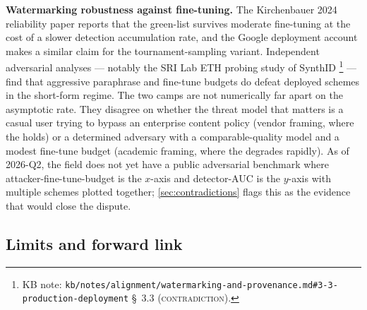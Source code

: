 \begin{contradiction}
\textbf{Watermarking robustness against fine-tuning.} The Kirchenbauer
2024 reliability paper  reports that the
green-list  survives moderate fine-tuning at the cost of a
slower detection accumulation rate, and the Google 
deployment account
makes a similar claim for the tournament-sampling variant. Independent
adversarial analyses --- notably the SRI Lab ETH probing study of
SynthID%
\footnote{KB note: \nolinkurl{kb/notes/alignment/watermarking-and-provenance.md#3-3-production-deployment}
\S~3.3 (\textsc{contradiction}).}
--- find that aggressive paraphrase and fine-tune budgets do defeat
deployed schemes in the short-form regime. The two camps are not
numerically far apart on the asymptotic rate. They disagree on whether
the threat model that matters is a casual user trying to bypass an
enterprise content policy (vendor framing, where the  holds)
or a determined adversary with a comparable-quality model and a
modest fine-tune budget (academic framing, where the 
degrades rapidly). As of 2026-Q2, the field does not yet have a
public adversarial benchmark where attacker-fine-tune-budget is the
$x$-axis and detector-AUC is the $y$-axis with multiple 
schemes plotted together; \cref{sec:contradictions} flags this as
the evidence that would close the dispute.
\end{contradiction}

\subsection{Limits and forward link}
\label{sec:watermarking-forward}

